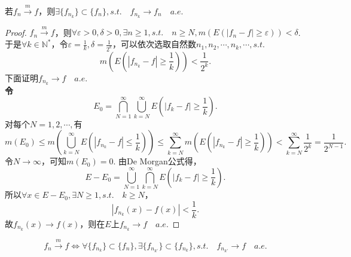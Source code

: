 \documentclass[bwprint, withoutpreface]{cumcmthesis}
\begin{document}
\begin{theorem}[Risez定理]
	若$f_n \stackrel{m}{\longrightarrow} f$，则$\exists \{f_{n_k}\} \subset \{f_n\}, s.t. \quad f_{n_k} \to f_n \quad a.e.$
\end{theorem}

\begin{proof}
	$f_n \stackrel{m}{\longrightarrow} f$，则$\forall \varepsilon > 0, \delta > 0, \exists n \geqslant 1, s.t. \quad n \geqslant N, m(E(|f_n - f| \geqslant \varepsilon)) < \delta$.
	于是$\forall k \in \mathbb{N}^*$，令$\varepsilon = \frac{1}{k}, \delta = \frac{1}{2^k}$，可以依次选取自然数$n_1, n_2, \cdots, n_k, \cdots, s.t.$
	\begin{equation*}
		m(E(|f_{n_k} - f| \geqslant \frac{1}{k})) < \frac{1}{2^k}.
	\end{equation*}
	下面证明$f_{n_k} \to f \quad a.e.$ \\
	\textbf{令\[E_0 = \bigcap_{N = 1}^{\infty}{\bigcup_{k = N}^{\infty}{E(|f_k - f| \geqslant \frac{1}{k})}}.\]}
	对每个$N = 1, 2, \cdots, $有
	\begin{equation*}
		m(E_0) \leqslant m(\bigcup_{k = N}^{\infty}{E(|f_{n_k} - f| \leqslant \frac{1}{k})}) \leqslant \sum_{k = N}^{\infty}{m(E(|f_{n_k} - f| \geqslant \frac{1}{k}))} < \sum_{k = N}^{\infty}{\frac{1}{2^k}} = \frac{1}{2^{N - 1}}.
	\end{equation*}
	令$N \to \infty$，可知$m(E_0) = 0$.
	由De Morgan公式得，
	\begin{equation*}
		E - E_0 = \bigcup_{N = 1}^{\infty}{\bigcap_{k = N}^{\infty}{E(|f_k - f| \geqslant \frac{1}{k})}}.
	\end{equation*}
	所以$\forall x \in E - E_0, \exists N \geqslant 1, s.t. \quad k \geqslant N$，
	\begin{equation*}
		|f_{n_k}(x) - f(x)| < \frac{1}{k}.
	\end{equation*}
	故$f_{n_k}(x) \to f(x)$，则在$E$上$f_{n_k} \to f \quad a.e.$
\end{proof}

\begin{theorem}[Risez定理的一个应用]
	\begin{equation*}
		f_n \stackrel{m}{\longrightarrow} f \Leftrightarrow \forall \{f_{n_k}\} \subset \{f_n\}, \exists \{f_{n_{k'}}\} \subset \{f_{n_k}\}, s.t. \quad f_{n_{k'}} \to f \quad a.e.		
	\end{equation*}
\end{theorem}
\end{document}
